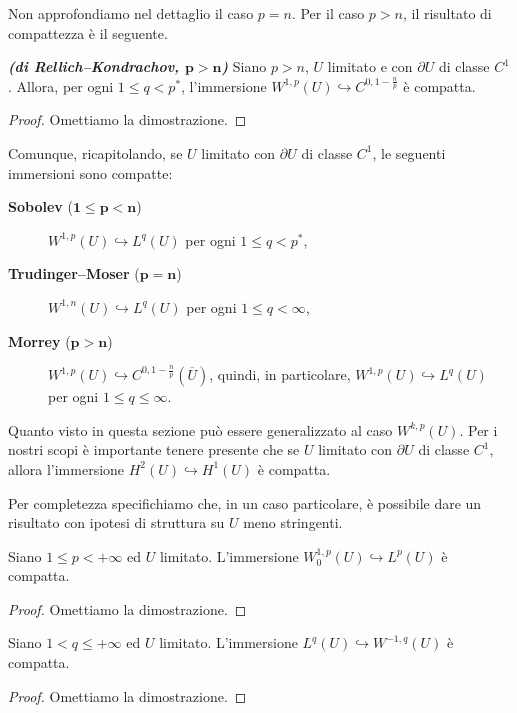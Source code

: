 Non approfondiamo nel dettaglio il caso $p=n$. Per il caso $p > n$, il risultato di compattezza è il seguente.
\begin{teorema}\textbf{\emph{(di Rellich--Kondrachov, $\mathbf{p>n}$)}}
	Siano $p > n$, $U$ limitato e con $\partial U$ di classe $C^1$. Allora, per ogni $1 \le q < p^\ast$, l'immersione $W^{1,p}(U) \hookrightarrow C^{0,1-\frac{n}{p}}$ è compatta.
\end{teorema}
\begin{proof}
	Omettiamo la dimostrazione.
\end{proof}
Comunque, ricapitolando, se $U$ limitato con $\partial U$ di classe $C^1$, le seguenti immersioni sono compatte:
\begin{description}
	\item[\textbf{Sobolev} ($\mathbf{1\le p< n}$)] $W^{1,p}(U) \hookrightarrow L^{q}(U)$ per ogni $1 \le q < p^\ast$,
	\item[\textbf{Trudinger--Moser} ($\mathbf{p=n}$)] $W^{1,n}(U) \hookrightarrow L^{q}(U)$ per ogni $1 \le q < \infty$,
	\item[\textbf{Morrey} ($\mathbf{p > n}$)] $W^{1,p}(U) \hookrightarrow C^{0,1 - \frac{n}{p}}(\overline{U})$, quindi, in particolare, $W^{1,p}(U) \hookrightarrow L^{q}(U)$ per ogni $1 \le q \le \infty$.
\end{description}

\begin{osservazione}
	Quanto visto in questa sezione può essere generalizzato al caso $W^{k,p}(U)$. Per i nostri scopi è importante tenere presente che se $U$ limitato con $\partial U$ di classe $C^1$, allora l'immersione $H^2(U) \hookrightarrow H^1(U)$ è compatta.
\end{osservazione}

Per completezza specifichiamo che, in un caso particolare, è possibile dare un risultato con ipotesi di struttura su $U$ meno stringenti.
\begin{proposizione}\label{Rellichsottosteroidi}
	Siano $1 \le p < +\infty$ ed $U$ limitato. L'immersione $W^{1,p}_0(U) \hookrightarrow L^p(U)$ è compatta.
\end{proposizione}
\begin{proof}
Omettiamo la dimostrazione.
\end{proof}
\begin{proposizione}\label{Rellichsottosteroididuale}
	Siano $1 < q \le +\infty$ ed $U$ limitato. L'immersione $L^q(U) \hookrightarrow W^{-1,q}(U)$ è compatta.
\end{proposizione}
\begin{proof}
Omettiamo la dimostrazione.
\end{proof}

